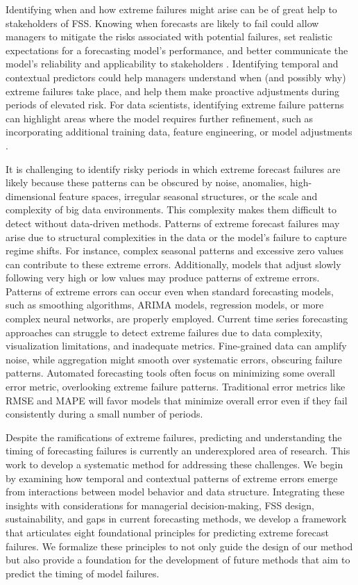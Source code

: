 \documentclass[ijds,sglanonrev]{informs4}
\begin{document}
Identifying when and how extreme failures might arise can be of great help to stakeholders of FSS. Knowing when forecasts are likely to fail could allow managers to mitigate the risks associated with potential failures, set realistic expectations for a forecasting model's performance, and better communicate the model's reliability and applicability to stakeholders \citep{cakmak2024}. Identifying temporal and contextual predictors could help managers understand when (and possibly why) extreme failures take place, and help them make proactive adjustments during periods of elevated risk. For data scientists, identifying extreme failure patterns can highlight areas where the model requires further refinement, such as incorporating additional training data, feature engineering, or model adjustments \citep{cakmak2024}. 

It is challenging to identify risky periods in which extreme forecast failures are likely because these patterns can be obscured by noise, anomalies, high-dimensional feature spaces, irregular seasonal structures, or the scale and complexity of big data environments. This complexity makes them difficult to detect without data-driven methods. Patterns of extreme forecast failures may arise due to structural complexities in the data or the model’s failure to capture regime shifts. For instance, complex seasonal patterns and excessive zero values can contribute to these extreme errors. Additionally, models that adjust slowly following very high or low values may produce patterns of extreme errors. Patterns of extreme errors can occur even when standard forecasting models, such as smoothing algorithms, ARIMA models, regression models, or more complex neural networks, are properly employed. Current time series forecasting approaches can struggle to detect extreme failures due to data complexity, visualization limitations, and inadequate metrics. Fine-grained data can amplify noise, while aggregation might smooth over systematic errors, obscuring failure patterns. Automated forecasting tools often focus on minimizing some overall error metric, overlooking extreme failure patterns. Traditional error metrics like RMSE and MAPE will favor models that minimize overall error even if they fail consistently during a small number of periods. 

Despite the ramifications of extreme failures, predicting and understanding the timing of forecasting failures is currently an underexplored area of research. This work to develop a systematic method for addressing these challenges. We begin by examining how temporal and contextual patterns of extreme errors emerge from interactions between model behavior and data structure. Integrating these insights with considerations for managerial decision-making, FSS design, sustainability, and gaps in current forecasting methods, we develop a framework that articulates eight foundational principles for predicting extreme forecast failures. We formalize these principles to not only guide the design of our method but also provide a foundation for the development of future methods that aim to predict the timing of model failures. 
\end{document}
